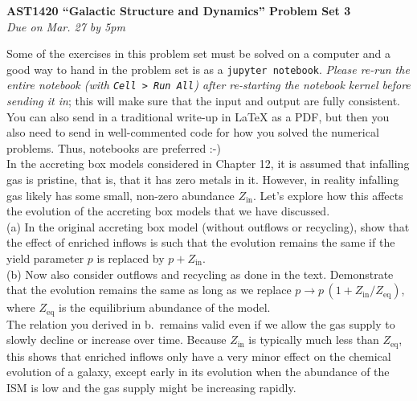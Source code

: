 \documentclass[12pt]{article}
\begin{document}
\begin{center}
{\bf \LARGE AST1420 ``Galactic Structure and Dynamics'' Problem Set 3}\\[7pt]
\emph{Due on Mar. 27 by 5pm}\\[7pt]
\end{center}

Some of the exercises in this problem set must be solved on a computer
and a good way to hand in the problem set is as a \texttt{jupyter
  notebook}. \emph{Please re-run the entire notebook (with \texttt{Cell
    > Run All}) after re-starting the notebook kernel before sending
  it in}; this will make sure that the input and output are fully
consistent. You can also send in a traditional write-up in LaTeX as a PDF, 
but then you also need to send in well-commented code for how you solved 
the numerical problems. Thus, notebooks are preferred :-)\\

 In the accreting box models considered in Chapter 12, it is 
assumed that infalling gas is pristine, that is, that it has zero metals in it. However, 
in reality infalling gas likely has some small, non-zero abundance \(Z_{\mathrm{in}}\). 
Let's explore how this affects the evolution of the accreting box models that we have 
discussed.\\

(a) In the original accreting box model (without outflows or recycling), show that the 
effect of enriched inflows is such that the evolution remains the same if the yield 
parameter \(p\) is replaced by \(p+Z_{\mathrm{in}}\).\\

(b) Now also consider outflows and recycling as done in the text. Demonstrate that the 
evolution remains the same as long as we replace 
\(p \rightarrow p\,(1+Z_{\mathrm{in}}/Z_{\mathrm{eq}})\), where \(Z_{\mathrm{eq}}\) 
is the equilibrium abundance of the model.\\

The relation you derived in b.\ remains valid even if we allow the gas supply to slowly 
decline or increase over time. Because \(Z_{\mathrm{in}}\) is typically much less than 
\(Z_{\mathrm{eq}}\), this shows that enriched inflows only have a very minor effect on 
the chemical evolution of a galaxy, except early in its evolution when the abundance of 
the ISM is low and the gas supply might be increasing rapidly.\\
\end{document}

